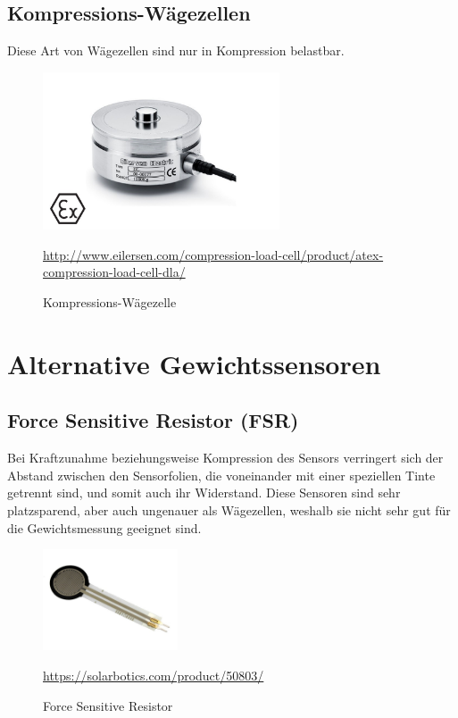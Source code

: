 \subsection{Kompressions-Wägezellen}
Diese Art von Wägezellen sind nur in Kompression belastbar.
\begin{figure}[ht]
    \center
    \includegraphics[width=7cm]{Bilder/waegezelle-kompression.jpg}\\
    \caption{Kompressions-Wägezelle}
    \begin{center} \quelle\url{http://www.eilersen.com/compression-load-cell/product/atex-compression-load-cell-dla/} \end{center}
\end{figure}
\newpage
\section{Alternative Gewichtssensoren}
\subsection{Force Sensitive Resistor (FSR)}
Bei Kraftzunahme beziehungsweise Kompression des Sensors verringert sich der Abstand zwischen den Sensorfolien, die voneinander mit einer speziellen Tinte getrennt sind, und somit auch ihr Widerstand. Diese Sensoren sind sehr platzsparend, aber auch ungenauer als Wägezellen, weshalb sie nicht sehr gut für die Gewichtsmessung geeignet sind.
\begin{figure}[ht]
    \center
    \includegraphics[width=4cm]{Bilder/waegezelle-force.jpg}\\
    \caption{Force Sensitive Resistor}
    \begin{center} \quelle\url{https://solarbotics.com/product/50803/} \end{center}
\end{figure}
